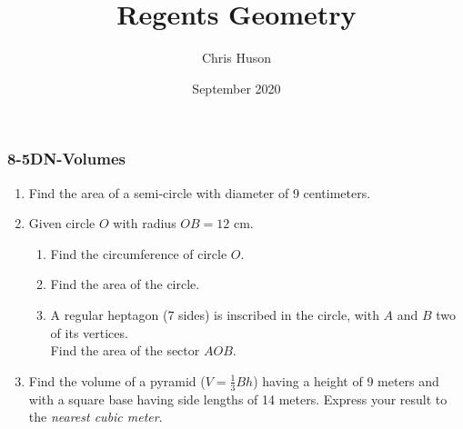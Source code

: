 \documentclass[12pt, twoside]{article}
\title{Regents Geometry}
\author{Chris Huson}
\date{September 2020}
\begin{document}
\subsubsection*{8-5DN-Volumes}
\begin{enumerate}
\item Find the area of a semi-circle with diameter of 9 centimeters.
   \begin{flushright}
  \end{flushright}

\item Given circle $O$ with radius $OB=12$ cm.
    \begin{multicols}{2}
    \raggedcolumns
    \begin{enumerate}
      \item Find the circumference of circle $O$. \vspace{1.7cm}
      \item Find the area of the circle.  \vspace{2cm}
      \item A regular heptagon (7 sides) is inscribed in the circle, with $A$ and $B$ two of its vertices. \\[0.25cm]
      Find the area of the sector $AOB$. \vspace{1.5cm}
    \end{enumerate}
    \end{multicols}  \vspace{3cm}

\item Find the volume of a pyramid ($V=\frac{1}{3}Bh$) having a height of 9 meters and with a square base having side lengths of 14 meters. Express your result to the \emph{nearest cubic meter}. \vspace{5cm}


\end{enumerate}
\end{document}
